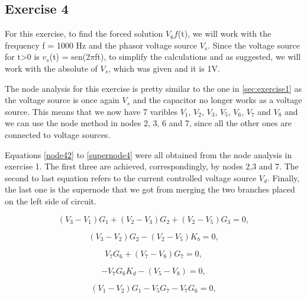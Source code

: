 \subsection{Exercise 4}
\label{sec:exercise4}



For this exercise, to find the forced solution $V_6f$(t), we will work with the frequency f = 1000 Hz and the phasor voltage source $V_s$. Since the voltage source for t>0 is $v_s$(t) = sen(2$\pi$ft), to simplify the calculations and as suggested, we will work with the absolute of $V_s$, which was given and it is 1V. 

The node analysis for this exercise is pretty similar to the one in \ref{sec:exercise1} as the voltage source is once again $V_s$ and the capacitor no longer works as a voltage source. This means that we now have 7 varibles $V_1$, $V_2$, $V_3$, $V_5$, $V_6$, $V_7$ and $V_8$ and we can use the node method in nodes 2, 3, 6 and 7, since all the other ones are connected to voltage sources.

Equations \ref{node42} to \ref{supernode4} were all obtained from the node analysis in exercise 1. The first three are achieved, correspondingly, by nodes 2,3 and 7. The second to last equation refers to the current controlled voltage source $V_d$. Finally, the last one is the supernode that we got from merging the two branches placed on the left side of circuit.

\begin{equation}
  (V_{3} - V_{1})G_{1} + (V_{2} - V_{3})G_{2} + (V_{2} - V_{5})G_{3}= 0,
  \label{eq:node42}
\end{equation}

\begin{equation}
  (V_{3} - V_{2})G_{2} - (V_{2} - V_{5})K_{b} = 0,
  \label{eq:node43}
\end{equation}


\begin{equation}
  V_{7}G_{6} + (V_{7} - V_{8})G_{7} = 0,
  \label{eq:node47}
\end{equation}


\begin{equation}
  -V_{7}G_{6}K_{d} - (V_{5} - V_{8}) = 0,
  \label{eq:vd4}
\end{equation}

\begin{equation}
  (V_{1} - V_{2})G_{1} - V_{5}G_{7} - V_{7}G_{6} = 0,
  \label{eq:supernode4}
\end{equation}

